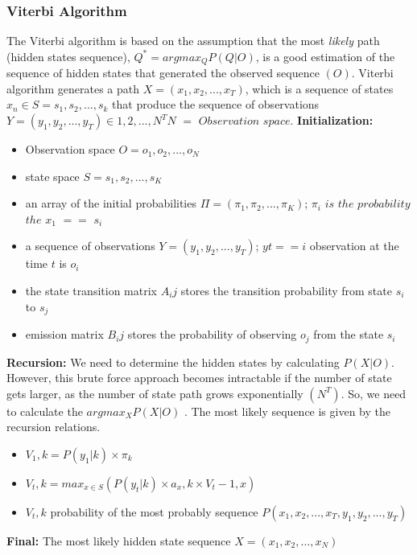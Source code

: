 \subsubsection{Viterbi Algorithm}
The Viterbi algorithm is based on the assumption that the most \textit{likely} path (hidden states sequence), $Q^* = argmax_Q P(Q|O) $, is a good estimation of the sequence of hidden states that generated the observed sequence $(O)$. Viterbi algorithm generates a path $X = (x_1, x_2,...,x_T)$, which is a sequence of states $x_n \in S = {s_1, s_2,...,s_k}$ that produce the sequence of observations $Y = (y_1,y_2,...,y_T) \in {1,2,...,N}^T N$ $=$ $Observation$ $space$.
\textbf{Initialization:}
\begin{itemize}
\item Observation space $O =  {o_1,o_2,...,o_N}$
\item state space $S = {s_1,s_2,...,s_K}$
\item an array of the initial probabilities $\Pi = (\pi_1, \pi_2,...,\pi_K)$; $\pi_i$ $is$ $the$ $probability$ $the$ $x_1$ $==$ $s_i$
\item a sequence of observations $Y = (y_1,y_2,...,y_T)$; $yt == i$ observation at the time $t$ is $o_i$
\item the state transition matrix $A_ij$ stores the transition probability from state $s_i$ to $s_j$
\item emission matrix $B_ij$ stores the probability of observing $o_j$ from the state $s_i$
\end{itemize}  
\textbf{Recursion:}
We need to determine the hidden states by calculating $P(X|O)$. However, this brute force approach becomes intractable if the number of state gets larger, as the number of state path grows exponentially $(N^T)$. So, we need to calculate the $argmax_X P(X|O)$ . The most likely sequence is given by the recursion relations.
\begin{center}
\begin{itemize}
\item $V_1,k = P (y_1|k) \times \pi_k$
\item $V_t,k = max_{x \in S} (P (y_t|k) \times a_x,k \times V_t-1,x)$
\item $V_t,k$ probability of the most probably sequence $P (x_1, x_2,...,x_T, y_1,y_2,...,y_T)$
\end{itemize}
\end{center}
\textbf{Final:}
The most likely hidden state sequence $X = (x_1,x_2,...,x_N)$ 

